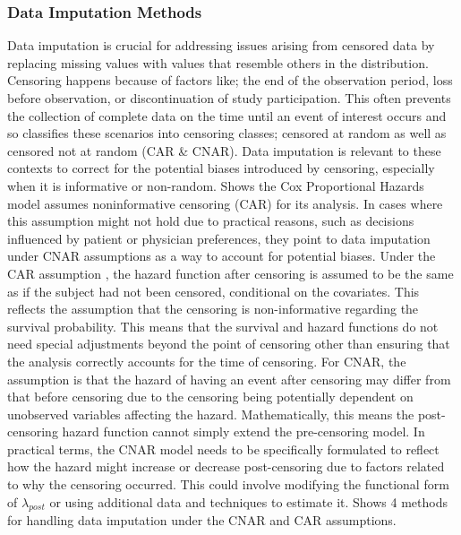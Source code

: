 \subsubsection{Data Imputation Methods} \label{impute}
Data imputation is crucial for addressing issues arising from censored data by replacing missing values with values that resemble others in the distribution. Censoring happens because of factors like; the end of the observation period, loss before observation, or discontinuation of study participation. This often prevents the collection of complete data on the time until an event of interest occurs and so \parencite{jin_imputation_2024} classifies these scenarios into censoring classes; censored at random as well as censored not at random (CAR \& CNAR). Data imputation is relevant to these contexts to correct for the potential biases introduced by censoring, especially when it is informative or non-random. \parencite{jin_imputation_2024} Shows the Cox Proportional Hazards model assumes noninformative censoring (CAR) for its analysis. In cases where this assumption might not hold due to practical reasons, such as decisions influenced by patient or physician preferences, they point to data imputation under CNAR assumptions as a way to account for potential biases. Under the CAR assumption \parencite{jin_imputation_2024}, the hazard function after censoring is assumed to be the same as if the subject had not been censored, conditional on the covariates. This reflects the assumption that the censoring is non-informative regarding the survival probability. This means that the survival and hazard functions do not need special adjustments beyond the point of censoring other than ensuring that the analysis correctly accounts for the time of censoring. For CNAR, \parencite{jin_imputation_2024} the assumption is that the hazard of having an event after censoring may differ from that before censoring due to the censoring being potentially dependent on unobserved variables affecting the hazard. Mathematically, this means the post-censoring hazard function cannot simply extend the pre-censoring model. In practical terms, the CNAR model needs to be specifically formulated to reflect how the hazard might increase or decrease post-censoring due to factors related to why the censoring occurred. This could involve modifying the functional form of \(\lambda_{post}\) or using additional data and techniques to estimate it. \parencite{jin_imputation_2024} Shows 4 methods for handling data imputation under the CNAR and CAR assumptions.

